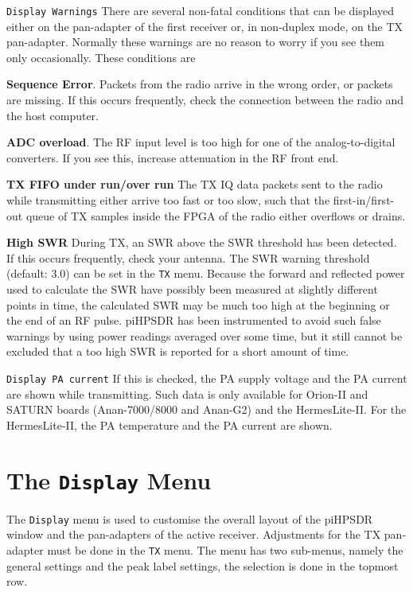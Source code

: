 \documentclass[12pt]{book}
\def\rett#1{\texttt{\color{red}#1}}
\def\bltt#1{\texttt{\color{blue}#1}}
\def\pH{pi\-HPSDR\xspace}
\begin{document}
\rett{Display Warnings} There are several non-fatal conditions that can
be displayed either on the pan-adapter of the first receiver or, in non-duplex
mode, on the TX pan-adapter. Normally these warnings are no reason to worry
if you see them  only occasionally. These conditions are

\textbf{Sequence Error}. Packets from the radio arrive in the wrong order, or packets
are missing. If this occurs frequently, check the connection between the radio and
the host computer.

\textbf{ADC overload}. The RF input level is too high for one of the analog-to-digital
converters. If you see this, increase attenuation in the RF front end.

\textbf{TX FIFO under run/over run} The TX IQ data packets sent to the radio while transmitting
either arrive too fast or too slow, such that the first-in/first-out queue of TX samples
inside the FPGA of the radio either overflows or drains.

\textbf{High SWR} During TX, an SWR above the SWR threshold has been detected. If this occurs
frequently, check your antenna. The SWR warning threshold (default: 3.0) can be set in the
\bltt{TX} menu. Because the forward and reflected power used to calculate the SWR have
possibly been measured at slightly different points in time, the calculated SWR may be
much too high at the beginning or the end of an RF pulse. \pH has been instrumented to
avoid such false warnings by using power readings averaged over some time, but it still
cannot be excluded that a too high SWR is reported for a short amount of time.

\rett{Display PA current} If this is checked, the PA supply voltage and the PA current
are shown while transmitting. Such data is only available for Orion-II and SATURN boards
(Anan-7000/8000 and Anan-G2) and the HermesLite-II.
For the HermesLite-II, the PA temperature and the PA current are shown.
\section{The \texttt{Display} Menu}

The \bltt{Display} menu is used to customise the overall layout of the \pH
window and the pan-adapters of the active receiver. Adjustments
for the TX pan-adapter must be done in the \bltt{TX} menu. The menu has two sub-menus,
namely the general settings and the peak label settings, the selection is done
in the topmost row.
\end{document}
